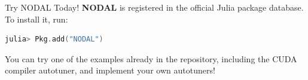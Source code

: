 \documentclass{beamer}
\begin{document}
\begin{frame}[fragile]
\begin{columns}[t]
\begin{column}{.48\linewidth}
\begin{block}{\Large Try NODAL Today!}
            \textbf{NODAL} is registered in the official Julia
            package database. To install it, run:
            \vspace{2cm}
        \begin{lstlisting}[language=C, basicstyle=\ttfamily\large,
            numbers=none,
            frame=no, showspaces=false, showstringspaces=false,
            numberstyle=\scriptsize,
            keywords={%
                @spawnat, remotecall, Nullable, Any,
                @spawn,
                @fetch, Future, Array, Float64, julia,
                while, true, function, end, put!,
                take!, sleep, RemoteChannel, Channel,
                Int, Tuple, const, addprocs, @schedule,
                @everywhere, for, in, myid, @async,
                remote_do, workers, Result, Real,
                AbstractFloat, deepcopy, rand, exp, true,
                Function, false, Run, mutable, struct,
                begin, Configuration, Dict, Symbol, using, import,
                ResultChannel, AbstractChannel, return, add, Pkg,
                NODAL%
            },
            otherkeywords={::, \&, \*, +, -, /, [, ], >, <, put!, take!,
            neighbor!, update!, NODAL}
        ]
        julia> Pkg.add("NODAL")
        \end{lstlisting}
            \vspace{2cm}
            You can try one of the examples already in the repository,
            including the CUDA compiler autotuner, and implement your own
            autotuners!
        \end{block}
    \end{column}
\end{columns}
\end{frame}
\end{document}
